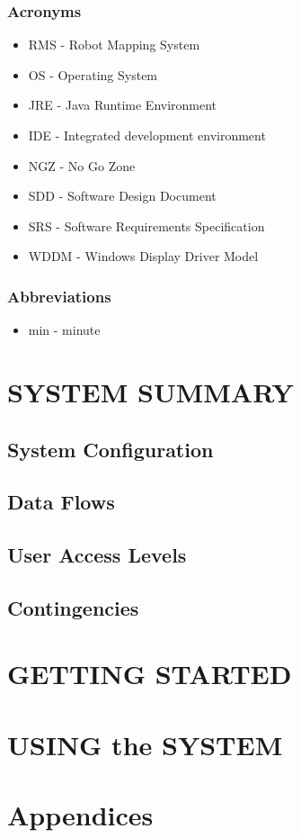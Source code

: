 \documentclass[10pt,a4paper,titlepage]{article}
\begin{document}
\subsubsection{Acronyms}
\begin{itemize}
\item RMS - Robot Mapping System
\item OS - Operating System
\item JRE - Java Runtime Environment
\item IDE - Integrated development environment
\item NGZ - No Go Zone
\item SDD - Software Design Document
\item SRS - Software Requirements Specification
\item WDDM - Windows Display Driver Model
\end{itemize}

\subsubsection{Abbreviations}
\begin{itemize}
	\item min - minute
\end{itemize}
    \newpage    
	\section{SYSTEM SUMMARY}
		\subsection{System Configuration}
        \subsection{Data Flows}
        \subsection{User Access Levels}
        \subsection{Contingencies }
    \newpage
	\section{GETTING STARTED}
	\newpage
	\section{USING the SYSTEM}
	\newpage
	\section{Appendices}
		
	
\end{document}
